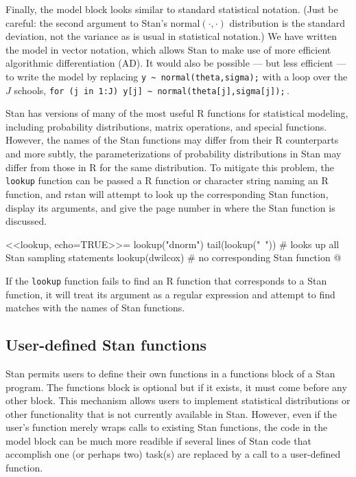 \documentclass[12pt]{article}
\newcommand{\R}{R\xspace}
\newcommand{\Stan}{Stan\xspace}
\newcommand{\code}[1]{{\tt #1}}
\newcommand{\strong}[1]{\texorpdfstring%
          {{\normalfont\fontseries{b}\selectfont #1}}%
            {#1}}
\let\pkg=\strong
\begin{document}
              Finally, the model block looks similar to standard statistical notation.
              (Just be careful:  the second argument to Stan's normal$(\cdot,\cdot)$
              distribution is the standard deviation, not the variance as is usual in
              statistical notation.)  We have written the model in vector notation, which
              allows Stan to make use of more efficient algorithmic differentiation (AD).  It
              would also be possible --- but less efficient --- to write the model by
              replacing \verb+y ~ normal(theta,sigma);+ with a loop over the $J$ schools,
              \verb+for (j in 1:J) y[j] ~ normal(theta[j],sigma[j]);+\,.
              
              \Stan has versions of many of the most useful \R functions for statistical modeling, 
              including probability distributions, matrix operations, and special functions. However,
              the names of the \Stan functions may differ from their \R counterparts and more subtly,
              the parameterizations of probability distributions in \Stan may differ from those in \R
              for the same distribution. To mitigate this problem, the \code{lookup} function can be
              passed a \R function or character string naming an \R function, and \pkg{rstan} will 
              attempt to look up the corresponding \Stan function, display its arguments, and give
              the page number in \cite{StanManual} where the \Stan function is discussed.
              
              <<lookup, echo=TRUE>>=
              lookup("dnorm")
              tail(lookup("~")) # looks up all Stan sampling statements
              lookup(dwilcox)   # no corresponding Stan function
              @
              
              If the \code{lookup} function fails to find an R function that corresponds to a 
              Stan function, it will treat its argument as a regular expression and attempt to
              find matches with the names of Stan functions.
              
              \subsection{User-defined Stan functions}
              
              \Stan permits users to define their own functions in a functions block of a \Stan
              program. The functions block is optional but if it exists, it must come before any
              other block. This mechanism allows users to implement statistical distributions or
              other functionality that is not currently available in \Stan. However, even if the
              user's function merely wraps calls to existing \Stan functions, the code in the model
              block can be much more readible if several lines of \Stan code that accomplish one
              (or perhaps two) task(s) are replaced by a call to a user-defined function.
              
\end{document}

